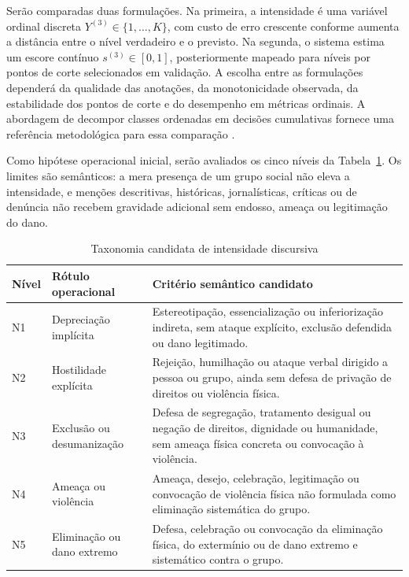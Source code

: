 Serão comparadas duas formulações. Na primeira, a intensidade é uma variável ordinal discreta \(Y^{(3)}\in\{1,\ldots,K\}\), com custo de erro crescente conforme aumenta a distância entre o nível verdadeiro e o previsto. Na segunda, o sistema estima um escore contínuo \(s^{(3)}\in[0,1]\), posteriormente mapeado para níveis por pontos de corte selecionados em validação. A escolha entre as formulações dependerá da qualidade das anotações, da monotonicidade observada, da estabilidade dos pontos de corte e do desempenho em métricas ordinais. A abordagem de decompor classes ordenadas em decisões cumulativas fornece uma referência metodológica para essa comparação \cite{frankhall2001}.

Como hipótese operacional inicial, serão avaliados os cinco níveis da Tabela~\ref{tab:taxonomia-c3}. Os limites são semânticos: a mera presença de um grupo social não eleva a intensidade, e menções descritivas, históricas, jornalísticas, críticas ou de denúncia não recebem gravidade adicional sem endosso, ameaça ou legitimação do dano.

\begin{table}[htbp]
\centering
\caption{Taxonomia candidata de intensidade discursiva}
\label{tab:taxonomia-c3}
\begin{tabular}{|p{}|p{}|p{}|}
\hline
\textbf{Nível} & \textbf{Rótulo operacional} & \textbf{Critério semântico candidato} \\
\hline
N1 & Depreciação implícita & Estereotipação, essencialização ou inferiorização indireta, sem ataque explícito, exclusão defendida ou dano legitimado. \\
\hline
N2 & Hostilidade explícita & Rejeição, humilhação ou ataque verbal dirigido a pessoa ou grupo, ainda sem defesa de privação de direitos ou violência física. \\
\hline
N3 & Exclusão ou desumanização & Defesa de segregação, tratamento desigual ou negação de direitos, dignidade ou humanidade, sem ameaça física concreta ou convocação à violência. \\
\hline
N4 & Ameaça ou violência & Ameaça, desejo, celebração, legitimação ou convocação de violência física não formulada como eliminação sistemática do grupo. \\
\hline
N5 & Eliminação ou dano extremo & Defesa, celebração ou convocação da eliminação física, do extermínio ou de dano extremo e sistemático contra o grupo. \\
\hline
\end{tabular}
\end{table}

